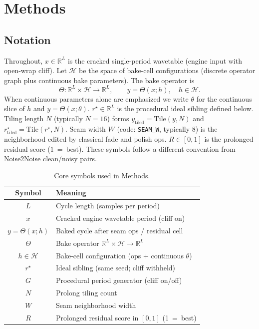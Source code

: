 \section{Methods}
\label{sec:methods}

\subsection{Notation}
\label{sec:notation}

Throughout, $x\in\mathbb{R}^{L}$ is the cracked single-period wavetable (engine input with open-wrap cliff).
Let $\mathcal{H}$ be the space of bake-cell configurations (discrete operator graph plus continuous bake parameters).
The bake operator is
\begin{equation}
\label{eq:Theta}
\Theta:\mathbb{R}^{L}\times\mathcal{H}\to\mathbb{R}^{L},\qquad
y=\Theta(x;h),\quad h\in\mathcal{H}.
\end{equation}
When continuous parameters alone are emphasized we write $\theta$ for the continuous slice of $h$ and $y=\Theta(x;\theta)$.
$r^{\star}\in\mathbb{R}^{L}$ is the procedural ideal sibling defined below.
Tiling length $N$ (typically $N{=}16$) forms $y_{\mathrm{tiled}}=\mathrm{Tile}(y,N)$ and $r^{\star}_{\mathrm{tiled}}=\mathrm{Tile}(r^{\star},N)$.
Seam width $W$ (code: \texttt{SEAM\_W}, typically $8$) is the neighborhood edited by classical fade and polish ops.
$R\in[0,1]$ is the prolonged residual score ($1$~=~best).
These symbols follow a different convention from Noise2Noise clean/noisy pairs.

\begin{table}[t]
  \centering
  \caption{Core symbols used in Methods.}
  \label{tab:symbols}
  \setlength{\tabcolsep}{3pt}
  \begin{tabular}{@{}cl@{}}
    \toprule
    Symbol & Meaning \\
    \midrule
    $L$ & Cycle length (samples per period) \\
    $x$ & Cracked engine wavetable period (cliff on) \\
    $y=\Theta(x;h)$ & Baked cycle after seam ops / residual cell \\
    $\Theta$ & Bake operator $\mathbb{R}^{L}\times\mathcal{H}\to\mathbb{R}^{L}$ \\
    $h\in\mathcal{H}$ & Bake-cell configuration (ops + continuous $\theta$) \\
    $r^{\star}$ & Ideal sibling (same seed; cliff withheld) \\
    $G$ & Procedural period generator (cliff on/off) \\
    $N$ & Prolong tiling count \\
    $W$ & Seam neighborhood width \\
    $R$ & Prolonged residual score in $[0,1]$ (1~=~best) \\
    \bottomrule
  \end{tabular}
\end{table}

